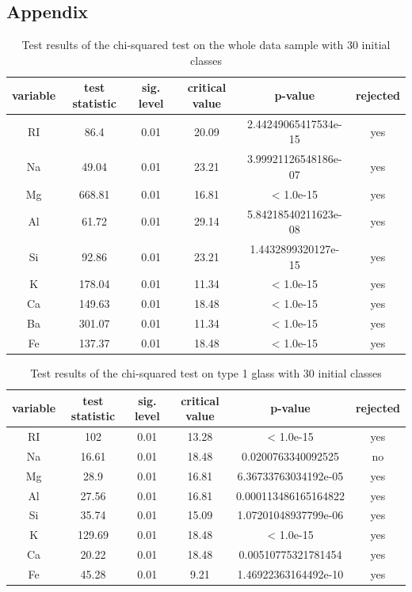 \documentclass[a4paper, 12pt, titlepage, headsepline, listof = totoc, bibliography = totoc, numbers = noenddot]{scrartcl}
\begin{document}
\begin{appendix}



\section{Appendix}

\begin{table}[h!]
\centering
\begin{tabular}{|cccccc|} \hline variable & test statistic & sig. level & critical value & p-value & rejected\\ \hline RI & 86.4 & 0.01 & 20.09 & 2.44249065417534e-15 & yes\\ 
Na & 49.04 & 0.01 & 23.21 & 3.99921126548186e-07 & yes\\ 
Mg & 668.81 & 0.01 & 16.81 & < 1.0e-15 & yes\\ 
Al & 61.72 & 0.01 & 29.14 & 5.84218540211623e-08 & yes\\ 
Si & 92.86 & 0.01 & 23.21 & 1.4432899320127e-15 & yes\\ 
K & 178.04 & 0.01 & 11.34 & < 1.0e-15 & yes\\ 
Ca & 149.63 & 0.01 & 18.48 & < 1.0e-15 & yes\\ 
Ba & 301.07 & 0.01 & 11.34 & < 1.0e-15 & yes\\ 
Fe & 137.37 & 0.01 & 18.48 & < 1.0e-15 & yes\\ \hline \end{tabular}\caption{Test results of the chi-squared test on the whole data sample with 30 initial classes}
\label{tab:chi-full-30}
\end{table}

\begin{table}[h!]
\centering
\begin{tabular}{|cccccc|} \hline variable & test statistic & sig. level & critical value & p-value & rejected\\ \hline RI & 102 & 0.01 & 13.28 & < 1.0e-15 & yes\\ 
Na & 16.61 & 0.01 & 18.48 & 0.0200763340092525 & no\\ 
Mg & 28.9 & 0.01 & 16.81 & 6.36733763034192e-05 & yes\\ 
Al & 27.56 & 0.01 & 16.81 & 0.000113486165164822 & yes\\ 
Si & 35.74 & 0.01 & 15.09 & 1.07201048937799e-06 & yes\\ 
K & 129.69 & 0.01 & 18.48 & < 1.0e-15 & yes\\ 
Ca & 20.22 & 0.01 & 18.48 & 0.00510775321781454 & yes\\ 
Fe & 45.28 & 0.01 & 9.21 & 1.46922363164492e-10 & yes\\ \hline \end{tabular}\caption{Test results of the chi-squared test on type 1 glass with 30 initial classes}
\label{tab:chi-type1-30}
\end{table}


\end{appendix}
\end{document}

